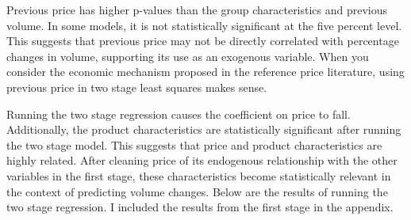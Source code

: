 \documentclass{article}
\begin{document}
Previous price has higher p-values than the group characteristics and previous volume. In some models, it is not statistically significant at the five percent level. This suggests that previous price may not be directly correlated with percentage changes in volume, supporting its use as an exogenous variable. When you consider the economic mechanism proposed in the reference price literature, using previous price in two stage least squares makes sense.

Running the two stage regression causes the coefficient on price to fall. Additionally, the product characteristics are statistically significant after running the two stage model. This suggests that price and product characteristics are highly related. After cleaning price of its endogenous relationship with the other variables in the first stage, these characteristics become statistically relevant in the context of predicting volume changes. Below are the results of running the two stage regression. I included the results from the first stage in the appendix.
\end{document}
